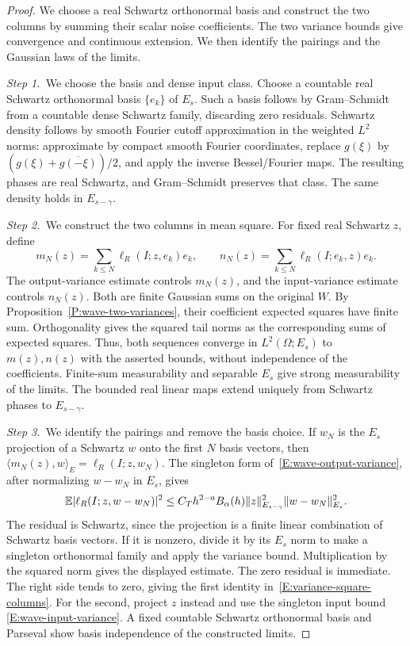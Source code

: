 \begin{proof}
  We choose a real Schwartz orthonormal basis and construct the two columns by
  summing their scalar noise coefficients. The two variance bounds give
  convergence and continuous extension. We then identify the pairings and the
  Gaussian laws of the limits.

  \medskip
  \noindent\textit{Step 1.~}We choose the basis and dense input class.
  Choose a countable real Schwartz orthonormal basis $\{e_k\}$ of $E_s$. Such a
  basis follows by Gram--Schmidt from a countable dense Schwartz family,
  discarding zero residuals. Schwartz density follows by smooth Fourier cutoff
  approximation in the weighted $L^2$ norms: approximate by compact smooth
  Fourier coordinates, replace $g(\xi)$ by $(g(\xi)+\overline{g(-\xi)})/2$, and
  apply the inverse Bessel/Fourier maps. The resulting phases are real Schwartz,
  and Gram--Schmidt preserves that class. The same density holds in
  $E_{s-\gamma}$.


  \medskip
  \noindent\textit{Step 2.~}We construct the two columns in mean square.
  For fixed real Schwartz $z$, define
  \[
    m_N(z) = \sum_{k\le N}\ell_R(I;z,e_k)e_k,
    \qquad n_N(z) = \sum_{k\le N}\ell_R(I;e_k,z)e_k.
  \]
  The output-variance estimate controls $m_N(z)$, and the input-variance
  estimate controls $n_N(z)$.
  Both are finite Gaussian sums on the original $W$. By
  Proposition~\ref{P:wave-two-variances}, their coefficient expected squares
  have finite sum. Orthogonality gives the squared tail norms as the
  corresponding sums of expected squares. Thus, both sequences converge in
  $L^2(\Omega;E_s)$ to $m(z),n(z)$ with the asserted bounds, without
  independence of the coefficients. Finite-sum measurability and separable $E_s$
  give strong measurability of the limits. The bounded real linear maps extend
  uniquely from Schwartz phases to $E_{s-\gamma}$.


  \medskip
  \noindent\textit{Step 3.~}We identify the pairings and remove the basis
  choice.
  If $w_N$ is the $E_s$ projection of a Schwartz $w$ onto the first $N$ basis
  vectors, then $\langle m_N(z),w\rangle_E = \ell_R(I;z,w_N)$. The singleton
  form of~\eqref{E:wave-output-variance}, after normalizing $w-w_N$ in $E_s$,
  gives
  \[
    \mathbb{E}|\ell_R(I;z,w-w_N)|^2
    \le C_T h^{2-a}B_\alpha(h)\|z\|_{E_{s-\gamma}}^2\|w-w_N\|_{E_s}^2.
  \]
  The residual is Schwartz, since the projection is a finite linear
  combination of Schwartz basis vectors. If it is nonzero, divide it by its
  $E_s$ norm to make a singleton orthonormal family and apply the variance
  bound. Multiplication by the squared norm gives the displayed estimate.
  The zero residual is immediate. The right side tends to zero, giving the first
  identity in~\eqref{E:variance-square-columns}. For the second, project $z$
  instead and use the singleton input bound \eqref{E:wave-input-variance}. A
  fixed countable Schwartz orthonormal basis and Parseval show basis
  independence of the constructed limits.



\end{proof}
